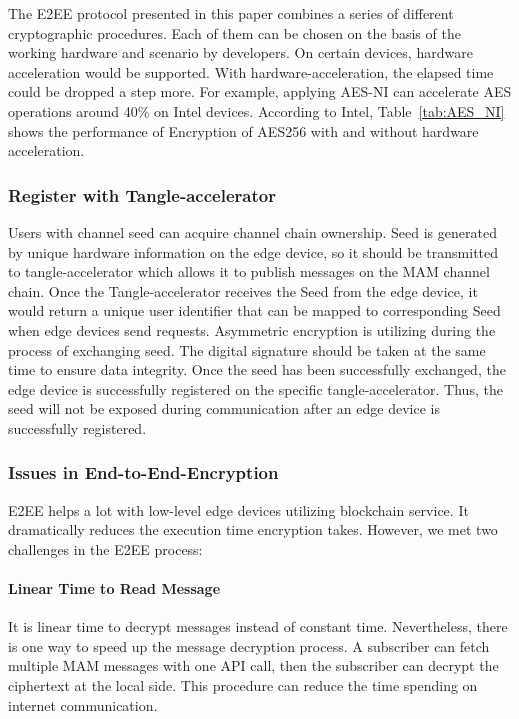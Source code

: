 \documentclass[conference]{IEEEtran}
\begin{document}
The E2EE protocol presented in this paper combines a series of different cryptographic procedures. Each of them can be chosen on the basis of the working hardware and scenario by developers. On certain devices, hardware acceleration would be supported. With hardware-acceleration, the elapsed time could be dropped a step more. For example, applying AES-NI can accelerate AES operations around 40\% on Intel devices.\cite{AES-NI-Acceleration} According to Intel, Table~\ref{tab:AES_NI} shows the performance of Encryption of AES256 with and without hardware acceleration.

\subsubsection{Register with Tangle-accelerator}
Users with channel seed can acquire channel chain ownership. Seed is generated by unique hardware information on the edge device, so it should be transmitted to tangle-accelerator which allows it to publish messages on the MAM channel chain. Once the Tangle-accelerator receives the Seed from the edge device, it would return a unique user identifier that can be mapped to corresponding Seed when edge devices send requests. Asymmetric encryption is utilizing during the process of exchanging seed. The digital signature should be taken at the same time to ensure data integrity. Once the seed has been successfully exchanged, the edge device is successfully registered on the specific tangle-accelerator. Thus, the seed will not be exposed during communication after an edge device is successfully registered.

\subsubsection{Issues in End-to-End-Encryption}
E2EE helps a lot with low-level edge devices utilizing blockchain service. It dramatically reduces the execution time encryption takes. However, we met two challenges in the E2EE process:

\paragraph{Linear Time to Read Message}
It is linear time to decrypt messages instead of constant time. Nevertheless, there is one way to speed up the message decryption process. A subscriber can fetch multiple MAM messages with one API call, then the subscriber can decrypt the ciphertext at the local side. This procedure can reduce the time spending on internet communication.
\end{document}
